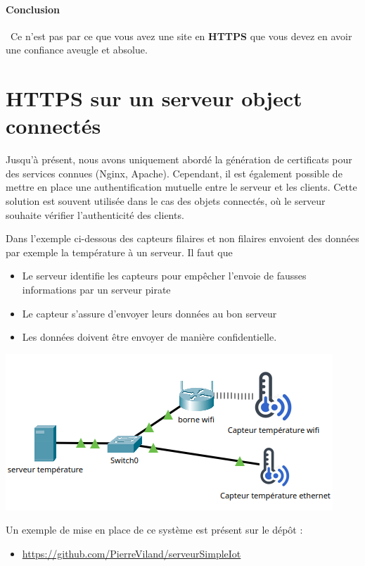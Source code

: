 \documentclass[french, 12pt]{article}%
\newcommand{\itemE}{\item[$\bullet$]}
\begin{document}
\paragraph{Conclusion} \ 
Ce n'est pas par ce que vous avez une site en \textbf{HTTPS} que vous devez en avoir une confiance aveugle et absolue.



\section{HTTPS sur un serveur object connectés}

Jusqu'à présent, nous avons uniquement abordé la génération de certificats pour des services connues (Nginx, Apache). Cependant, il est également possible de mettre en place une authentification mutuelle entre le serveur et les clients. Cette solution est souvent utilisée dans le cas des objets connectés, où le serveur souhaite vérifier l'authenticité des clients. 

Dans l'exemple ci-dessous des capteurs filaires et non filaires envoient des données par exemple la température à un serveur. Il faut que 
\begin{itemize}
\itemE Le serveur identifie les capteurs pour empêcher l'envoie de fausses informations par un serveur pirate
\itemE Le capteur s'assure d'envoyer leurs données au bon serveur
\itemE Les données doivent être envoyer de manière confidentielle.
\end{itemize}

\begin{center}
\includegraphics[scale=0.7]{./ressource/topoCapteurTemperature.png}
\end{center}


Un exemple de mise en place de ce système est présent sur le dépôt : 
\begin{itemize}
\itemE \href{https://github.com/PierreViland/serveurSimpleIot.git}{https://github.com/PierreViland/serveurSimpleIot}
\end{itemize}
\end{document}
